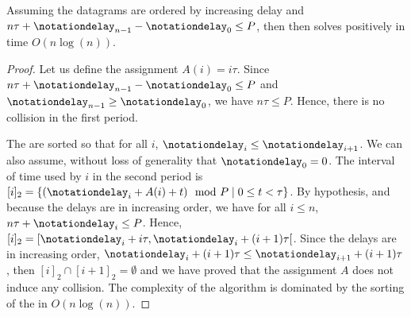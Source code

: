       \begin{proposition} Assuming the datagrams are ordered by increasing delay and $n\tau + \notationdelay_{n-1} - \notationdelay_0 \leq P$, then then \shortestlongest solves \pma positively in time $O(n\log(n))$.\label{prop:SL}
      \end{proposition}
      \begin{proof}
      Let us define the assignment $A(i) = i \tau$. Since $n\tau + \notationdelay_{n-1} - \notationdelay_0 \leq P$ and $\notationdelay_{n-1} \geq \notationdelay_0$, we have $n\tau \leq P$. Hence, there is no collision in the first period.

      The \nomdelaypluriel are sorted so that for all $i$, $\notationdelay_i \leq \notationdelay_{i+1}$. We can also assume, without loss of generality that $\notationdelay_0 = 0$. The interval of time used by $i$ in the second period is $[i]_2 = \{ (\notationdelay_i + A(i) + t) \mod P \mid 0 \leq t < \tau \}$. By hypothesis, and because the delays are in increasing order, we have for all $i\leq n$, $n\tau + \notationdelay_{i} \leq P$. Hence, $[i]_2 = [\notationdelay_i + i\tau, \notationdelay_i + (i+1)\tau[$. Since the delays are in increasing order, $\notationdelay_i + (i+1)\tau \leq \notationdelay_{i+1} + (i+1)\tau$, then $[i]_2 \cap [i+1]_2 = \emptyset$
      and we have proved that the assignment $A$ does not induce any collision.
        The complexity of the algorithm is dominated by the sorting of the \nomdelaypluriel in $O(n\log(n))$. 
      
      \end{proof}


